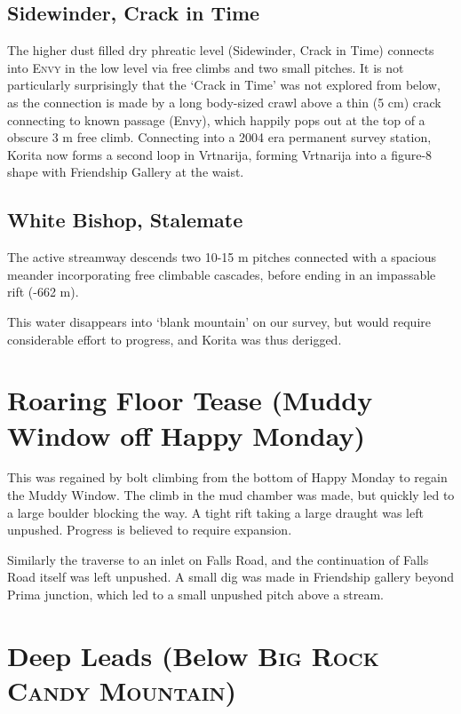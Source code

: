 \subsection{Sidewinder, Crack in Time}

The higher dust filled dry phreatic level (Sidewinder, Crack in Time)
connects into \textsc{Envy} in the low level via free climbs and two
small pitches. It is not particularly surprisingly that the `Crack in
Time' was not explored from below, as the connection is made by a long
body-sized crawl above a thin (5 cm) crack connecting to known passage
(Envy), which happily pops out at the top of a obscure 3 m free climb.
Connecting into a 2004 era permanent survey station, Korita now forms a
second loop in Vrtnarija, forming Vrtnarija into a figure-8 shape with
Friendship Gallery at the waist.

\subsection{White Bishop, Stalemate}

The active streamway descends two 10-15 m pitches connected with a
spacious meander incorporating free climbable cascades, before ending in
an impassable rift (-662 m).

This water disappears into `blank mountain' on our survey, but would
require considerable effort to progress, and Korita was thus derigged.

\section{Roaring Floor Tease (Muddy Window off Happy Monday)}

This was regained by bolt climbing from the bottom of Happy Monday to
regain the Muddy Window. The climb in the mud chamber was made, but
quickly led to a large boulder blocking the way. A tight rift taking a
large draught was left unpushed. Progress is believed to require
expansion.

Similarly the traverse to an inlet on Falls Road, and the continuation
of Falls Road itself was left unpushed. A small dig was made in
Friendship gallery beyond Prima junction, which led to a small unpushed
pitch above a stream.

\section{Deep Leads (Below \textsc{Big Rock Candy Mountain})}

